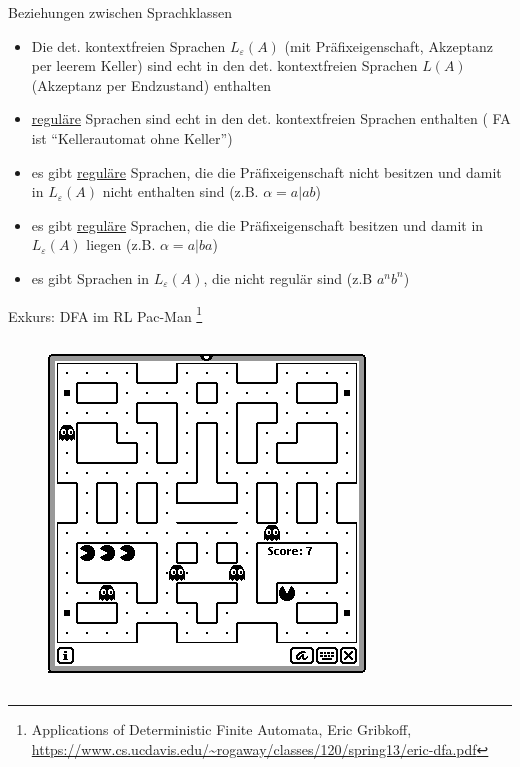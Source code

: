 \begin{frame}{Beziehungen zwischen Sprachklassen}
	\begin{itemize}
		\item Die det. kontextfreien Sprachen $L_\varepsilon(A)$ (mit Präfixeigenschaft, Akzeptanz per leerem Keller) sind echt in den det. kontextfreien Sprachen $L(A)$ (Akzeptanz per Endzustand) enthalten
		\item \underline{reguläre} Sprachen sind echt in den det. kontextfreien	Sprachen enthalten ( FA ist "`Kellerautomat ohne Keller"')
		\item es gibt \underline{reguläre} Sprachen, die die Präfixeigenschaft nicht besitzen und damit in $L_\varepsilon(A)$ nicht enthalten sind (z.B. $\alpha=a|ab$)
		\item es gibt \underline{reguläre} Sprachen, die die Präfixeigenschaft besitzen und damit in $L_\varepsilon(A)$ liegen (z.B. $\alpha=a|ba$)
		\item es gibt Sprachen in $L_\varepsilon(A)$, die nicht regulär sind (z.B ${a^nb^n}$)
	\end{itemize}
\end{frame}

\begin{frame}{Exkurs: DFA im RL}
Pac-Man \footnote{Applications of Deterministic Finite Automata, Eric Gribkoff, \url{https://www.cs.ucdavis.edu/~rogaway/classes/120/spring13/eric-dfa.pdf}}
		\begin{columns}
		\begin{figure}
			\includegraphics[width=0.6\linewidth]{images/Pac-Man}
		\end{figure}
	\end{columns}
\end{frame}